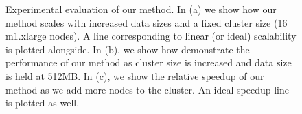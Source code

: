 \documentclass[11pt]{article}
\begin{document}
\begin{figure}
\centering
{} 
\caption{Experimental evaluation of our method. In (a) we show how our
method scales with increased data sizes and a fixed cluster size (16
m1.xlarge nodes). A line corresponding to linear (or ideal)
scalability is plotted alongside. In (b), we show how demonstrate the
performance of our method as cluster size is increased and data size
is held at 512MB. In (c), we show the relative speedup of our method
as we add more nodes to the cluster. An ideal speedup line is plotted
as well. }
\label{fig:experiments}
\end{figure}



\end{document}
